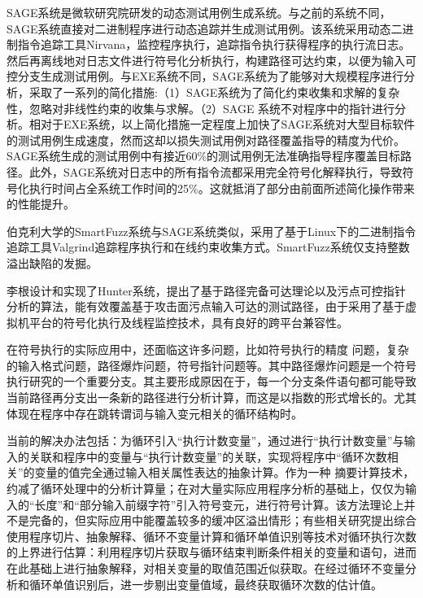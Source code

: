 SAGE系统是微软研究院研发的动态测试用例生成系统。与之前的系统不同，SAGE系统直接对二进制程序进行动态追踪并生成测试用例。该系统采用动态二进制指令追踪工具Nirvana，监控程序执行，追踪指令执行获得程序的执行流日志。然后再离线地对日志文件进行符号化分析执行，构建路径可达约束，以便为输入可控分支生成测试用例。与EXE系统不同，SAGE系统为了能够对大规模程序进行分析，采取了一系列的简化措施:（1）SAGE系统为了简化约束收集和求解的复杂性，忽略对非线性约束的收集与求解。（2）SAGE 系统不对程序中的指针进行分析。相对于EXE系统，以上简化措施一定程度上加快了SAGE系统对大型目标软件的测试用例生成速度，然而这却以损失测试用例对路径覆盖指导的精度为代价。SAGE系统生成的测试用例中有接近60\%的测试用例无法准确指导程序覆盖目标路径。此外，SAGE系统对日志中的所有指令流都采用完全符号化解释执行，导致符号化执行时间占全系统工作时间的25\%。这就抵消了部分由前面所述简化操作带来的性能提升。

伯克利大学的SmartFuzz系统与SAGE系统类似，采用了基于Linux下的二进制指令追踪工具Valgrind追踪程序执行和在线约束收集方式。SmartFuzz系统仅支持整数溢出缺陷的发掘。

李根设计和实现了Hunter系统，提出了基于路径完备可达理论以及污点可控指针分析的算法，能有效覆盖基于攻击面污点输入可达的测试路径，由于采用了基于虚拟机平台的符号化执行及线程监控技术，具有良好的跨平台兼容性。

在符号执行的实际应用中，还面临这许多问题，比如符号执行的精度
问题，复杂的输入格式问题，路径爆炸问题，符号指针问题等。其中路径爆炸问题是一个符号执行研究的一个重要分支。其主要形成原因在于，每一个分支条件语句都可能导致当前路径再分支出一条新的路径进行分析计算，而这是以指数的形式增长的。尤其体现在程序中存在跳转谓词与输入变元相关的循环结构时。

当前的解决办法包括：为循环引入“执行计数变量”，通过进行“执行计数变量”与输入的关联和程序中的变量与“执行计数变量”的关联，实现将程序中“循环次数相关”的变量的值完全通过输入相关属性表达的抽象计算。作为一种
摘要计算技术，约减了循环处理中的分析计算量；在对大量实际应用程序分析的基础上，仅仅为输入的“长度”和“部分输入前缀字符”引入符号变元，进行符号计算。该方法理论上并不是完备的，但实际应用中能覆盖较多的缓冲区溢出情形；有些相关研究提出综合使用程序切片、抽象解释、循环不变量计算和循环单值识别等技术对循环执行次数的上界进行估算：利用程序切片获取与循环结束判断条件相关的变量和语句，进而在此基础上进行抽象解释，对相关变量的取值范围近似获取。在经过循环不变量分析和循环单值识别后，进一步剔出变量值域，最终获取循环次数的估计值。

